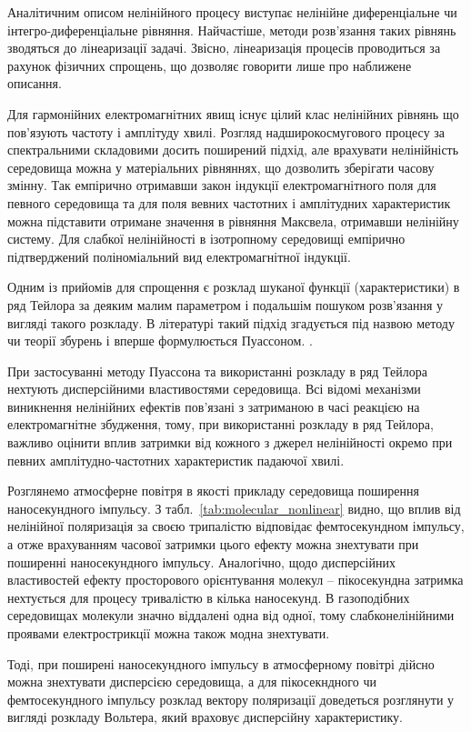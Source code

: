 Аналітичним описом нелінійного процесу виступає нелінійне диференціальне чи 
інтегро-диференціальне рівняння. Найчастіше, методи розв'язання таких рівнянь
зводяться до лінеаризації задачі. Звісно, лінеаризація процесів проводиться за
рахунок фізичних спрощень, що дозволяє говорити лише про наближене описання.

Для гармонійних електромагнітних явищ існує цілий клас нелінійних рівнянь що пов'язують частоту і амплітуду хвилі. Розгляд надширокосмугового процесу
за спектральними складовими досить поширений підхід, але врахувати нелінійність 
середовища можна у матеріальних рівняннях, що дозволить зберігати часову змінну.
Так емпірично отримавши закон індукції електромагнітного поля для певного середовища та для поля вевних частотних і амплітудних характеристик можна 
підставити отримане значення в рівняння Максвела, отримавши нелінійну систему.
Для слабкої нелінійності в ізотропному середовищі емпірично підтверджений поліноміальний вид електромагнітної індукції.

Одним із прийомів для спрощення є розклад шуканої функції (характеристики) в 
ряд Тейлора за деяким малим параметром і подальшім пошуком розв'язання у 
вигляді такого розкладу. В літературі такий підхід згадується під назвою 
методу чи теорії збурень і вперше формулюється Пуассоном.
\cite{imp:NonlinearWaves1983}.

При застосуванні методу Пуассона та використанні розкладу в ряд Тейлора 
нехтують дисперсійними властивостями середовища. Всі відомі механізми 
виникнення нелінійних ефектів пов'язані з затриманою в часі реакцією на електромагнітне збудження, тому, при використанні розкладу в ряд Тейлора, 
важливо оцінити вплив затримки від кожного з джерел нелінійності окремо 
при певних амплітудно-частотних характеристик падаючої хвилі. 

Розглянемо атмосферне повітря в якості прикладу середовища поширення
наносекундного імпульсу. З табл.~\ref{tab:molecular_nonlinear} видно, що вплив 
від нелінійної поляризація за своєю трипалістю відповідає фемтосекундном 
імпульсу, а отже врахуванням часової затримки цього ефекту можна знехтувати 
при поширенні наносекундного імпульсу. Аналогічно, щодо дисперсійних 
властивостей ефекту просторового орієнтування молекул -- пікосекундна 
затримка нехтується для процесу тривалістю в кілька наносекунд. 
В газоподібних середовищах молекули значно віддалені одна від одної, тому
слабконелінійними проявами електрострикції можна також модна знехтувати.

Тоді, при поширені наносекундного імпульсу в атмосферному повітрі дійсно 
можна знехтувати дисперсією середовища, а для пікосекндного чи 
фемтосекундного імпульсу розклад вектору поляризації доведеться розглянути 
у вигляді розкладу Вольтера, який враховує дисперсійну характеристику.

